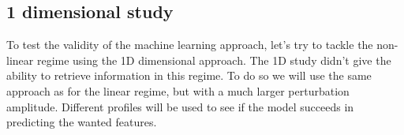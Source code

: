 \documentclass[11pt,a4paper,openany]{report}
\begin{document}
\begin{multicols}{2}
    \section{1 dimensional study}
    To test the validity of the machine learning approach, let's try to tackle the non-linear regime using the 1D dimensional approach. The 1D study didn't give the ability to retrieve information in this regime.
    To do so we will use the same approach as for the linear regime, but with a much larger perturbation amplitude. Different profiles will be used to see if the model succeeds in predicting the wanted features.




\end{multicols}
\end{document}
